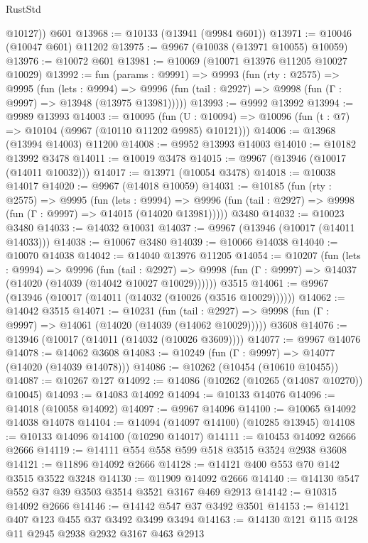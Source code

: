 \begin{lexlean}{RustStd}
\begin{coremodule}
        @10127))
    @601
@13968 := @10133 (@13941 (@9984 @601))
@13971 := @10046 (@10047 @601) @11202
@13975 := @9967 (@10038 (@13971 @10055) @10059)
@13976 := @10072 @601
@13981 := @10069 (@10071 @13976 @11205 @10027 @10029)
@13992 := fun (params : @9991) =>
  @9993
    (fun (rty : @2575) =>
    @9995
      (fun (lets : @9994) =>
      @9996 (fun (tail : @2927) => @9998 (fun (Γ : @9997) => @13948 (@13975 @13981)))))
@13993 := @9992 @13992
@13994 := @9989 @13993
@14003 := @10095
    (fun (U : @10094) => @10096 (fun (t : @7) => @10104 (@9967 (@10110 @11202 @9985) @10121)))
@14006 := @13968 (@13994 @14003) @11200
@14008 := @9952 @13993 @14003
@14010 := @10182 @13992 @3478
@14011 := @10019 @3478
@14015 := @9967 (@13946 (@10017 (@14011 @10032)))
@14017 := @13971 (@10054 @3478)
@14018 := @10038 @14017
@14020 := @9967 (@14018 @10059)
@14031 := @10185
    (fun (rty : @2575) =>
    @9995
      (fun (lets : @9994) =>
      @9996 (fun (tail : @2927) => @9998 (fun (Γ : @9997) => @14015 (@14020 @13981)))))
    @3480
@14032 := @10023 @3480
@14033 := @14032 @10031
@14037 := @9967 (@13946 (@10017 (@14011 @14033)))
@14038 := @10067 @3480
@14039 := @10066 @14038
@14040 := @10070 @14038
@14042 := @14040 @13976 @11205
@14054 := @10207
    (fun (lets : @9994) =>
    @9996
      (fun (tail : @2927) =>
      @9998 (fun (Γ : @9997) => @14037 (@14020 (@14039 (@14042 @10027 @10029))))))
    @3515
@14061 := @9967 (@13946 (@10017 (@14011 (@14032 (@10026 (@3516 @10029))))))
@14062 := @14042 @3515
@14071 := @10231
    (fun (tail : @2927) => @9998 (fun (Γ : @9997) => @14061 (@14020 (@14039 (@14062 @10029)))))
    @3608
@14076 := @13946 (@10017 (@14011 (@14032 (@10026 @3609))))
@14077 := @9967 @14076
@14078 := @14062 @3608
@14083 := @10249 (fun (Γ : @9997) => @14077 (@14020 (@14039 @14078)))
@14086 := @10262 (@10454 (@10610 @10455))
@14087 := @10267 @127
@14092 := @14086 (@10262 (@10265 (@14087 @10270)) @10045)
@14093 := @14083 @14092
@14094 := @10133 @14076
@14096 := @14018 (@10058 @14092)
@14097 := @9967 @14096
@14100 := @10065 @14092 @14038 @14078
@14104 := @14094 (@14097 @14100) (@10285 @13945)
@14108 := @10133 @14096 @14100 (@10290 @14017)
@14111 := @10453 @14092 @2666 @2666
@14119 := @14111 @554 @558 @599 @518 @3515 @3524 @2938 @3608
@14121 := @11896 @14092 @2666
@14128 := @14121 @400 @553 @70 @142 @3515 @3522 @3248
@14130 := @11909 @14092 @2666
@14140 := @14130 @547 @552 @37 @39 @3503 @3514 @3521 @3167 @469 @2913
@14142 := @10315 @14092 @2666
@14146 := @14142 @547 @37 @3492 @3501
@14153 := @14121 @407 @123 @455 @37 @3492 @3499 @3494
@14163 := @14130 @121 @115 @128 @11 @2945 @2938 @2932 @3167 @463 @2913

\end{coremodule}
\end{lexlean}

